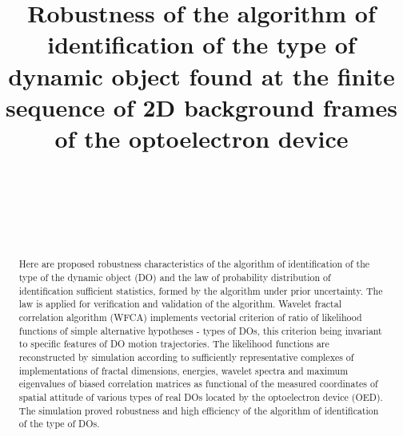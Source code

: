 \documentclass[
11pt,%
tightenlines,%
twoside,%
onecolumn,%
nofloats,%
nobibnotes,%
nofootinbib,%
superscriptaddress,%
noshowpacs,%
centertags]%
{revtex4}
\begin{document}

\title{Robustness of the algorithm of identification of the type of dynamic object found at the finite sequence of 2D background frames of the optoelectron device}


\author{}

\author{~}

\author{~}

\author{~}




\begin{abstract}
Here are proposed robustness characteristics of the algorithm of identification of the type of the dynamic object (DO) and the law of probability distribution of identification sufficient statistics, formed by the algorithm under prior uncertainty.
The law is applied for verification and validation of the algorithm.
Wavelet fractal correlation algorithm (WFCA) implements vectorial criterion of ratio of likelihood functions of simple alternative hypotheses - types of DOs, this criterion being invariant to specific features of DO motion trajectories.
The likelihood functions are reconstructed by simulation according to sufficiently representative complexes of implementations of fractal dimensions, energies, wavelet spectra and maximum eigenvalues of biased correlation matrices as functional of the measured coordinates of spatial attitude of various types of real DOs located by the optoelectron device (OED).
The simulation proved  robustness and high efficiency of the algorithm of identification of the type of DOs.
\end{abstract}
\end{document}
